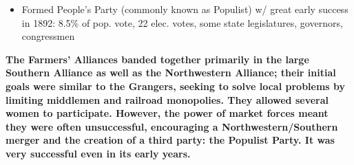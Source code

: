 \documentclass[a4paper]{article}
\begin{document}
{\begin{itemize}
\begin{itemize}
\begin{itemize}
                    \item Formed People's Party (commonly known as Populist) w/ great early success in 1892: 8.5\% of pop. vote, 22 elec. votes, some state legislatures, governors, congressmen 
                \end{itemize}
            \end{itemize}
        \end{itemize}
        \textbf{The Farmers' Alliances banded together primarily in the large Southern Alliance as well as the Northwestern Alliance; their initial goals were similar to the Grangers, seeking to solve local problems by limiting middlemen and railroad monopolies. They allowed several women to participate. However, the power of market forces meant they were often unsuccessful, encouraging a Northwestern/Southern merger and the creation of a third party: the Populist Party. It was very successful even in its early years.}}
\end{document}
